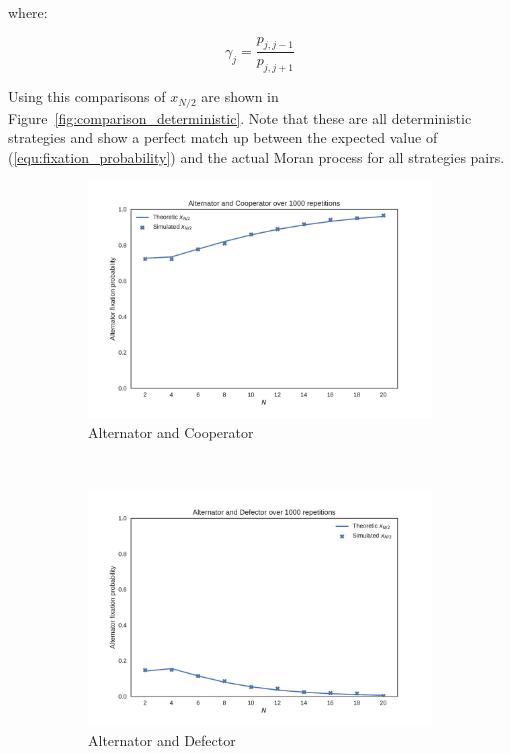 \documentclass{article}
\begin{document}
where:

\[
\gamma_j = \frac{p_{j, j-1}}{p_{j, j+1}}
\]

Using this comparisons of \(x_{N/2}\) are shown in
Figure~\ref{fig:comparison_deterministic}. Note that these are all deterministic
strategies and show a perfect match up between the expected value of
(\ref{equ:fixation_probability}) and the actual Moran process for all
strategies pairs.

\begin{figure}[!hbtp]
    \centering
    \begin{subfigure}[t]{.3\textwidth}
        \centering
        \includegraphics[width=.8\textwidth]{../img/Alternator_v_Cooperator.pdf}
        \caption{Alternator and Cooperator}
    \end{subfigure}%
    ~
    \begin{subfigure}[t]{.3\textwidth}
        \centering
        \includegraphics[width=.8\textwidth]{../img/Alternator_v_Defector.pdf}
        \caption{Alternator and Defector}
    \end{subfigure}%
    ~
    \begin{subfigure}[t]{.3\textwidth}

\end{subfigure}
\end{figure}
\end{document}
